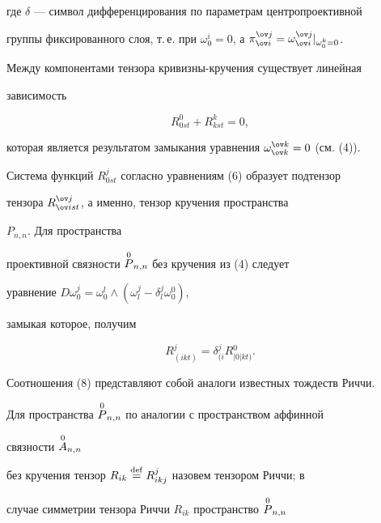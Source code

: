 где $\delta$ --- символ дифференцирования по параметрам центропроективной 


группы фиксированного слоя, т.\,е. при $\omega^i_0=0$, а $\pi^{\ov j}_{\ov 


i}=\omega^{\ov j}_{\ov i}|_{\omega^k_0=0}$. 


 


Между компонентами тензора кривизны-кручения существует линейная 


зависимость


\begin{equation}


R^0_{0st}+R^k_{kst}=0, 


\end{equation}


которая является результатом замыкания уравнения $\omega^{\ov k}_{\ov 


k}=0$ (см. (4)). 


 


Система функций $R^j_{0st}$ согласно уравнениям (6) образует подтензор 


тензора $R^{\ov j}_{\ov i st}$, а именно, тензор кручения пространства 


$P_{n,n}$. Для пространства 


проективной связности $\overset{0}{P}{}_{n,n}$ без кручения из (4) следует 


уравнение $D\omega^j_0=\omega^l_0\wedge(\omega^j_l-\delta^j_l 


\omega^0_0)$, 


замыкая которое, получим 


\begin{equation} 


R^j_{(ikt)}=\delta{}^j_{(i}R{}^0_{|0|kt)}.


\end{equation} 


Соотношения (8) представляют собой аналоги известных тождеств Риччи. 


 


Для пространства $\overset{0}{P}{}_{n,n}$ по аналогии с пространством аффинной 


связности $\overset{0}{A}{}_{n,n}$ 


без кручения тензор $R_{ik}\overset{\mathrm{def}}{=}{} R^j_{ikj}$ назовем тензором Риччи; в 


случае симметрии тензора Риччи $R_{ik}$ пространство $\overset{0}{P}{}_{n,n}$ 


